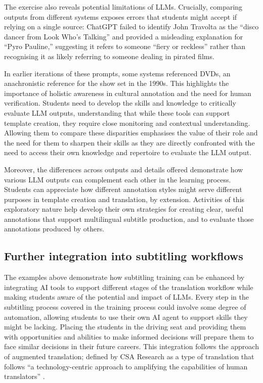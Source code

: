 \documentclass[output=paper]{langscibook}
\begin{document}
The exercise also reveals potential limitations of LLMs. Crucially, comparing outputs from different systems exposes errors that students might accept if relying on a single source: ChatGPT failed to identify John Travolta as the “disco dancer from Look Who’s Talking” and provided a misleading explanation for “Pyro Pauline,” suggesting it refers to someone “fiery or reckless” rather than recognising it as likely referring to someone dealing in pirated films. 

In earlier iterations of these prompts, some systems referenced DVDs, an anachronistic reference for the show set in the 1990s. This highlights the importance of holistic awareness in cultural annotation and the need for human verification. Students need to develop the skills and knowledge to critically evaluate LLM outputs, understanding that while these tools can support template creation, they require close monitoring and contextual understanding. Allowing them to compare these disparities emphasises the value of their role and the need for them to sharpen their skills as they are directly confronted with the need to access their own knowledge and repertoire to evaluate the LLM output.

Moreover, the differences across outputs and details offered demonstrate how various LLM outputs can complement each other in the learning process. Students can appreciate how different annotation styles might serve different purposes in template creation and translation, by extension. Activities of this exploratory nature help develop their own strategies for creating clear, useful annotations that support multilingual subtitle production, and to evaluate those annotations produced by others.

\subsection{Further integration into subtitling workflows}

The examples above demonstrate how subtitling training can be enhanced by integrating AI tools to support different stages of the translation workflow while making students aware of the potential and impact of LLMs. Every step in the subtitling process covered in the training process could involve some degree of automation, allowing students to use their own AI agent to support skills they might be lacking. Placing the students in the driving seat and providing them with opportunities and abilities to make informed decisions will prepare them to face similar decisions in their future careers. This integration follows the approach of augmented translation; defined by CSA Research as a type of translation that follows “a technology-centric approach to amplifying the capabilities of human translators” \citep{lommel2020augmented}.
\end{document}
